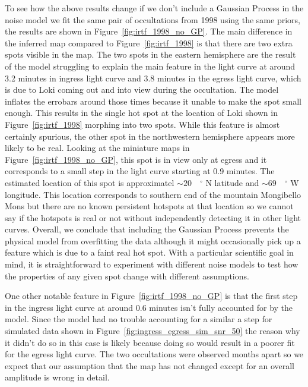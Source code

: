 \documentclass[modern]{aastex62}
\begin{document}
To see how the above results change if we don't include a Gaussian Process in the noise model we fit the same pair of occultations from 1998 using the same priors, the results are shown in Figure~\ref{fig:irtf_1998_no_GP}.
The main difference in the inferred map compared to Figure~\ref{fig:irtf_1998} is that there are two extra spots visible in the map.
The two spots in the eastern hemisphere are the result of the model struggling to explain the main feature in the light curve at around 3.2 minutes in ingress light curve and 3.8 minutes in the egress light curve, which is due to  Loki coming out and into view during the occultation.
The model inflates the errobars around those times because it unable to make the spot small enough.
This results in the single hot spot at the location of Loki shown in Figure~\ref{fig:irtf_1998} morphing into two spots.
While this feature is almost certainly spurious, the other spot in the northwestern hemisphere appears more likely to be real.
Looking at the miniature maps in Figure~\ref{fig:irtf_1998_no_GP}, this spot is in view only at egress and it corresponds to a small step in the light curve starting at 0.9 minutes.
The estimated location of this spot is approximatel $\sim 20\quad^\circ$ N latitude and $\sim 69\quad^\circ$ W longitude.
This location corresponds to southern end of the mountain Mongibello Mons but there are no known persistent hotspots at that location so we cannot say if the hotspots is real or not without independently detecting it in other light curves.
Overall, we conclude that including the Gaussian Process prevents the physical model from overfitting the data although it might occasionally pick up a feature which is due to a faint real hot spot.
With a particular scientific goal in mind, it is straightforward to experiment with different noise models to test how the properties of any given spot change with different assumptions.


One other notable feature in Figure~\ref{fig:irtf_1998_no_GP} is that the first step in the ingress light curve at around 0.6 minutes isn't fully accounted for by the model.
Since the model had no trouble accounting for a similar a step for simulated data shown in Figure~\ref{fig:ingress_egress_sim_snr_50} the reason why it didn't do so in this case is likely because doing so would result in a poorer fit for the egress light curve.
The two occultations were observed months apart so we expect that our assumption that the map has not changed except for an overall amplitude is wrong in detail.  
\end{document}
